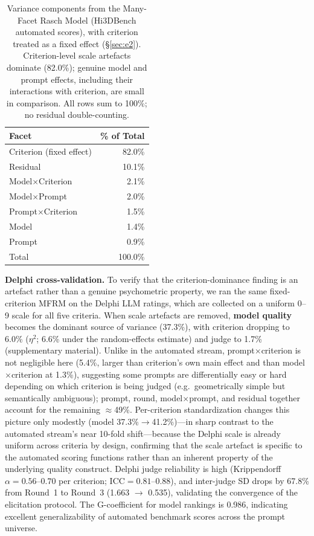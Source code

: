 \documentclass[10pt]{article}
\begin{document}
\begin{table}[h]
\centering
\small
\caption{Variance components from the Many-Facet Rasch Model (Hi3DBench
automated scores), with criterion treated as a fixed effect
(\S\ref{sec:e2}). Criterion-level scale artefacts dominate (82.0\%); genuine
model and prompt effects, including their interactions with criterion, are
small in comparison. All rows sum to 100\%; no residual double-counting.}
\label{tab:vc}
\begin{tabular}{lr}
\toprule
Facet & \% of Total \\
\midrule
Criterion (fixed effect)         & 82.0\% \\
Residual                         & 10.1\% \\
Model$\times$Criterion           &  2.1\% \\
Model$\times$Prompt              &  2.0\% \\
Prompt$\times$Criterion          &  1.5\% \\
Model                            &  1.4\% \\
Prompt                           &  0.9\% \\
\midrule
Total                            & 100.0\% \\
\bottomrule
\end{tabular}
\end{table}

\textbf{Delphi cross-validation.}
To verify that the criterion-dominance finding is an artefact rather than a
genuine psychometric property, we ran the same fixed-criterion MFRM on the
Delphi LLM ratings, which are collected on a uniform 0--9 scale for all five
criteria.
When scale artefacts are removed, \textbf{model quality} becomes the dominant
source of variance (37.3\%), with criterion dropping to 6.0\% ($\eta^2$;
6.6\% under the random-effects estimate) and judge to 1.7\%
(supplementary material).
Unlike in the automated stream, prompt$\times$criterion is not negligible
here (5.4\%, larger than criterion's own main effect and than
model$\times$criterion at 1.3\%), suggesting some prompts are differentially
easy or hard depending on which criterion is being judged (e.g.\ geometrically
simple but semantically ambiguous); prompt, round, model$\times$prompt, and
residual together account for the remaining $\approx$49\%.
Per-criterion standardization changes this picture only modestly (model
37.3\%$\to$41.2\%)---in sharp contrast to the automated stream's near
10-fold shift---because the Delphi scale is already uniform across criteria
by design, confirming that the scale artefact is specific to the automated
scoring functions rather than an inherent property of the underlying quality
construct.
Delphi judge reliability is high (Krippendorff $\alpha=0.56$--$0.70$ per
criterion; ICC$=0.81$--$0.88$), and inter-judge SD drops by 67.8\% from
Round~1 to Round~3 (1.663 $\to$ 0.535), validating the convergence of
the elicitation protocol.
The G-coefficient for model rankings is 0.986, indicating excellent
generalizability of automated benchmark scores across the prompt universe.
\end{document}
